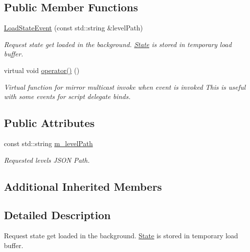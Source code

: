 \subsection*{Public Member Functions}
\begin{DoxyCompactItemize}
\item 
\hyperlink{classLoadStateEvent_a01b3f0b41f4f78df73b2d54255560120}{Load\+State\+Event} (const std\+::string \&level\+Path)
\begin{DoxyCompactList}\small\item\em Request state get loaded in the background. \hyperlink{classState}{State} is stored in temporary load buffer. \end{DoxyCompactList}\item 
\mbox{\label{classLoadStateEvent_a1053fd8d06b20871c6187ac376c0b7be}} 
virtual void \hyperlink{classLoadStateEvent_a1053fd8d06b20871c6187ac376c0b7be}{operator()} ()
\begin{DoxyCompactList}\small\item\em Virtual function for mirror multicast invoke when event is invoked This is useful with some events for script delegate binds. \end{DoxyCompactList}\end{DoxyCompactItemize}
\subsection*{Public Attributes}
\begin{DoxyCompactItemize}
\item 
\mbox{\label{classLoadStateEvent_aad20ef7e2e9fbc0301e58faa6ebb8634}} 
const std\+::string \hyperlink{classLoadStateEvent_aad20ef7e2e9fbc0301e58faa6ebb8634}{m\+\_\+level\+Path}
\begin{DoxyCompactList}\small\item\em Requested level\textquotesingle{}s J\+S\+ON Path. \end{DoxyCompactList}\end{DoxyCompactItemize}
\subsection*{Additional Inherited Members}


\subsection{Detailed Description}
Request state get loaded in the background. \hyperlink{classState}{State} is stored in temporary load buffer. 

